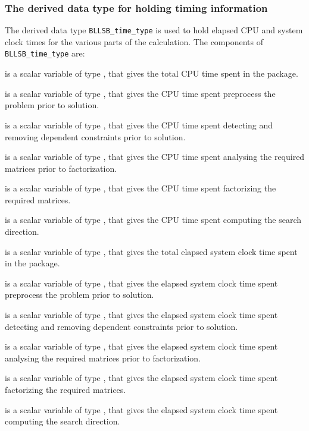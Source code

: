 \documentclass{galahad}
\newcommand{\packagename}{BLLSB}
\begin{document}

\subsubsection{The derived data type for holding timing
 information}\label{typetime}
The derived data type
{\tt \packagename\_time\_type}
is used to hold elapsed CPU and system clock times for the various parts of
the calculation. The components of
{\tt \packagename\_time\_type}
are:
\begin{description}
 is a scalar variable of type \realdp, that gives
 the total CPU time spent in the package.

 is a scalar variable of type \realdp, that gives
 the CPU time spent preprocess the problem prior to solution.

 is a scalar variable of type \realdp, that gives
 the CPU time spent detecting and removing dependent constraints prior
to solution.

 is a scalar variable of type \realdp, that gives
 the CPU time spent analysing the required matrices prior to factorization.

 is a scalar variable of type \realdp, that gives
 the CPU time spent factorizing the required matrices.

 is a scalar variable of type \realdp, that gives
 the CPU time spent computing the search direction.

 is a scalar variable of type \realdp, that gives
 the total elapsed system clock time spent in the package.

 is a scalar variable of type \realdp, that gives
 the elapsed system clock time spent preprocess the problem prior to solution.

 is a scalar variable of type \realdp,
that gives  the elapsed system clock time spent detecting and removing
dependent constraints prior to solution.

 is a scalar variable of type \realdp, that gives
 the elapsed system clock time spent analysing the required matrices prior to
factorization.

 is a scalar variable of type \realdp, that gives
 the elapsed system clock time spent factorizing the required matrices.

 is a scalar variable of type \realdp, that gives
 the elapsed system clock time spent computing the search direction.

\end{description}
\end{document}
